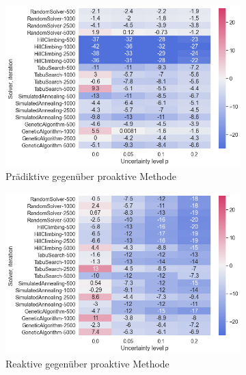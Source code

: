 \begin{figure}[H]

    \begin{subfigure}{0.497\linewidth}
        \centering
        \includegraphics[width=\linewidth]{assets/img/05_Evaluation/Heatmap_n1_1.png}
        \caption{Prädiktive gegenüber proaktive Methode}
        \label{fig:evaluation_solver_n1_heatmap_1}
    \end{subfigure}
    \hfill
    \begin{subfigure}{0.497\linewidth}
        \centering
        \includegraphics[width=\linewidth]{assets/img/05_Evaluation/Heatmap_n1_2.png}
        \caption{Reaktive gegenüber proaktive Methode}
        \label{fig:evaluation_solver_n1_heatmap_2}
    \end{subfigure}
    \par\bigskip 
    \begin{subfigure}{1\linewidth}

\end{subfigure}
\end{figure}

